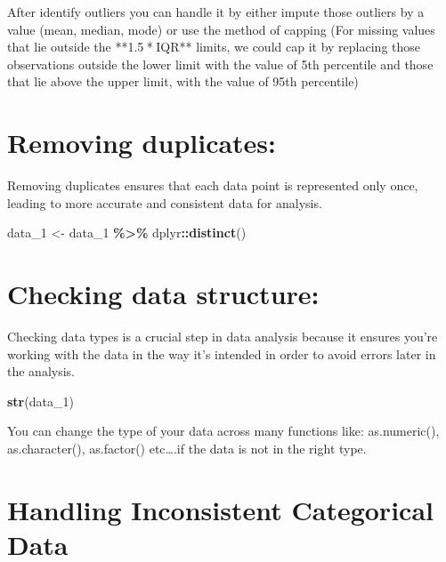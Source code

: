 \documentclass[
]{book}
\newenvironment{Shaded}{\begin{snugshade}}{\end{snugshade}}
\newcommand{\FunctionTok}[1]{\textcolor[rgb]{0.13,0.29,0.53}{\textbf{#1}}}
\newcommand{\NormalTok}[1]{#1}
\newcommand{\OtherTok}[1]{\textcolor[rgb]{0.56,0.35,0.01}{#1}}
\newcommand{\SpecialCharTok}[1]{\textcolor[rgb]{0.81,0.36,0.00}{\textbf{#1}}}
\begin{document}
After identify outliers you can handle it by either impute those outliers by a value (mean, median, mode) or use the method of capping (For missing values that lie outside the **1.5 * IQR** limits, we could cap it by replacing those observations outside the lower limit with the value of 5th percentile and those that lie above the upper limit, with the value of 95th percentile)

\hypertarget{removing-duplicates}{%
\section{\texorpdfstring{Removing duplicates:\\
}{Removing duplicates: }}\label{removing-duplicates}}

Removing duplicates ensures that each data point is represented only once, leading to more accurate and consistent data for analysis.

\begin{Shaded}
\begin{Highlighting}[]
\NormalTok{data\_1 }\OtherTok{\textless{}{-}}\NormalTok{ data\_1 }\SpecialCharTok{\%\textgreater{}\%} 
\NormalTok{  dplyr}\SpecialCharTok{::}\FunctionTok{distinct}\NormalTok{()}
\end{Highlighting}
\end{Shaded}

\hypertarget{checking-data-structure}{%
\section{Checking data structure:}\label{checking-data-structure}}

Checking data types is a crucial step in data analysis because it ensures you're working with the data in the way it's intended in order to avoid errors later in the analysis.

\begin{Shaded}
\begin{Highlighting}[]
\FunctionTok{str}\NormalTok{(data\_1)}
\end{Highlighting}
\end{Shaded}

You can change the type of your data across many functions like: as.numeric(), as.character(), as.factor() etc\ldots.if the data is not in the right type.

\hypertarget{handling-inconsistent-categorical-data}{%
\section{Handling Inconsistent Categorical Data}\label{handling-inconsistent-categorical-data}}
\end{document}
